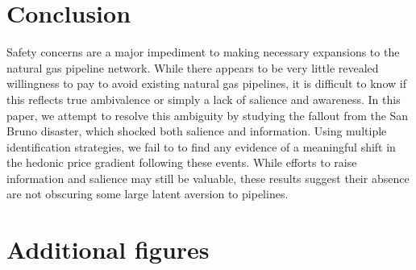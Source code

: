 \documentclass[12pt]{article}
\begin{document}
\section{Conclusion \label{sec:Conclusion}}

Safety concerns are a major impediment to making necessary expansions to the natural gas pipeline network. While there appears to be very little revealed willingness to pay to avoid existing natural gas pipelines, it is difficult to know if this reflects true ambivalence or simply a lack of salience and awareness. In this paper, we attempt to resolve this ambiguity by studying the fallout from the San Bruno disaster, which shocked both salience and information. Using multiple identification strategies, we fail to to find any evidence of a meaningful shift in the hedonic price gradient following these events. While efforts to raise information and salience may still be valuable, these results suggest their absence are not obscuring some large latent aversion to pipelines.

\section*{\protect\pagebreak{}}

%
%

\printbibliography

\section*{\protect\pagebreak{}}


\appendix
{}

\setcounter{figure}{0}  \renewcommand{\thefigure}{A.\arabic{figure}} 
\setcounter{table}{0}  \renewcommand{\thetable}{A.\arabic{table}} 

\section{Additional figures}
\end{document}
